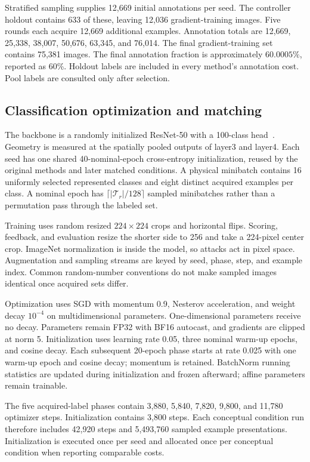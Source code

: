 \documentclass[a4paper,fleqn]{cas-dc}
\begin{document}
Stratified sampling supplies 12,669 initial annotations per seed.
The controller holdout contains 633 of these, leaving 12,036
gradient-training images. Five rounds each acquire 12,669
additional examples. Annotation totals are 12,669, 25,338, 38,007,
50,676, 63,345, and 76,014. The final gradient-training set
contains 75,381 images. The final annotation fraction is
approximately $60.0005\%$, reported as 60\%.
Holdout labels are included in every method's annotation cost.
Pool labels are consulted only after selection.

\subsection{Classification optimization and matching}

The backbone is a randomly initialized ResNet-50 with a 100-class
head~\cite{he2016deep}. Geometry is measured at the spatially pooled
outputs of layer3 and layer4. Each seed has one shared 40-nominal-epoch
cross-entropy initialization, reused by the original methods and
later matched conditions.
A physical minibatch contains 16 uniformly selected represented
classes and eight distinct acquired examples per class.
A nominal epoch has $\lceil|\mathcal T_r|/128\rceil$ sampled
minibatches rather than a permutation pass through the labeled set.

Training uses random resized $224\times224$ crops and horizontal
flips. Scoring, feedback, and evaluation resize the shorter side to
256 and take a 224-pixel center crop. ImageNet normalization is
inside the model, so attacks act in pixel space.
Augmentation and sampling streams are keyed by seed, phase, step,
and example index. Common random-number conventions do not make
sampled images identical once acquired sets differ.

Optimization uses SGD with momentum 0.9, Nesterov acceleration,
and weight decay $10^{-4}$ on multidimensional parameters.
One-dimensional parameters receive no decay.
Parameters remain FP32 with BF16 autocast, and gradients are
clipped at norm 5. Initialization uses learning rate 0.05,
three nominal warm-up epochs, and cosine decay.
Each subsequent 20-epoch phase starts at rate 0.025 with one
warm-up epoch and cosine decay; momentum is retained.
BatchNorm running statistics are updated during initialization
and frozen afterward; affine parameters remain trainable.

The five acquired-label phases contain 3,880, 5,840, 7,820,
9,800, and 11,780 optimizer steps.
Initialization contains 3,800 steps.
Each conceptual condition run therefore includes 42,920 steps and
5,493,760 sampled example presentations. Initialization is executed
once per seed and allocated once per conceptual condition when
reporting comparable costs.
\end{document}
